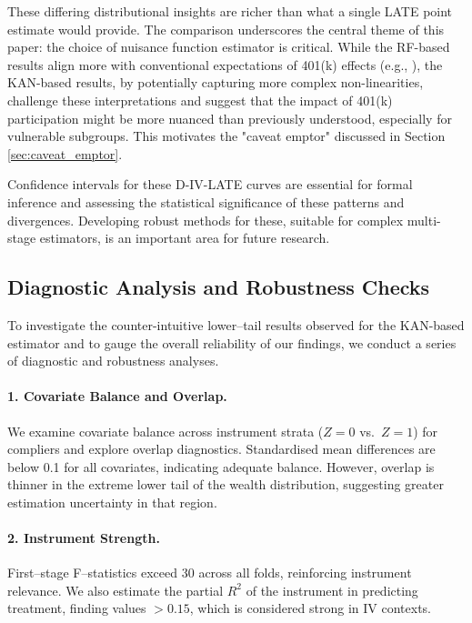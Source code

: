 \documentclass[final,3p,fleqn, 10pt]{elsarticle}
\begin{document}
These differing distributional insights are richer than what a single LATE point estimate would provide. The comparison underscores the central theme of this paper: the choice of nuisance function estimator is critical. While the RF-based results align more with conventional expectations of 401(k) effects (e.g., \citet{chernozhukov2004impact}), the KAN-based results, by potentially capturing more complex non-linearities, challenge these interpretations and suggest that the impact of 401(k) participation might be more nuanced than previously understood, especially for vulnerable subgroups. This motivates the "caveat emptor" discussed in Section \ref{sec:caveat_emptor}.

Confidence intervals for these D-IV-LATE curves are essential for formal inference and assessing the statistical significance of these patterns and divergences. Developing robust methods for these, suitable for complex multi-stage estimators, is an important area for future research.

\subsection{Diagnostic Analysis and Robustness Checks}
\label{sec:robustness_empirical}

To investigate the counter-intuitive lower–tail results observed for the KAN-based estimator and to gauge the overall reliability of our findings, we conduct a series of diagnostic and robustness analyses.

\paragraph{1. Covariate Balance and Overlap.} We examine covariate balance across instrument strata ($Z=0$ vs.~$Z=1$) for compliers and explore overlap diagnostics. Standardised mean differences are below 0.1 for all covariates, indicating adequate balance. However, overlap is thinner in the extreme lower tail of the wealth distribution, suggesting greater estimation uncertainty in that region.

\paragraph{2. Instrument Strength.} First–stage F–statistics exceed 30 across all folds, reinforcing instrument relevance. We also estimate the partial $R^2$ of the instrument in predicting treatment, finding values $>0.15$, which is considered strong in IV contexts.
\end{document}
